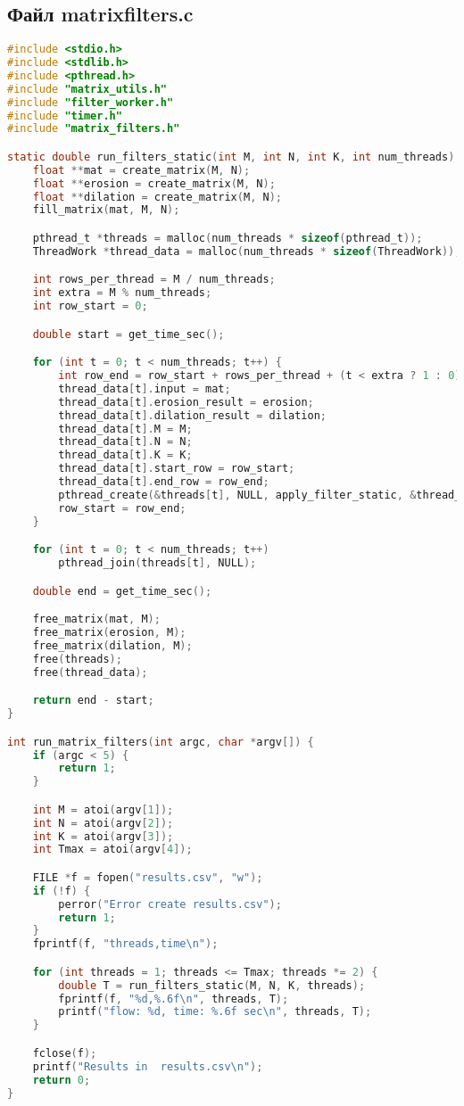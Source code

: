 \subsection*{Файл matrixfilters.c}

\begin{lstlisting}[language=C,caption={Обработка ввода, подсчет времени},captionpos=b]
#include <stdio.h>
#include <stdlib.h>
#include <pthread.h>
#include "matrix_utils.h"
#include "filter_worker.h"
#include "timer.h"
#include "matrix_filters.h"

static double run_filters_static(int M, int N, int K, int num_threads) {
    float **mat = create_matrix(M, N);
    float **erosion = create_matrix(M, N);
    float **dilation = create_matrix(M, N);
    fill_matrix(mat, M, N);

    pthread_t *threads = malloc(num_threads * sizeof(pthread_t));
    ThreadWork *thread_data = malloc(num_threads * sizeof(ThreadWork));

    int rows_per_thread = M / num_threads;
    int extra = M % num_threads;
    int row_start = 0;

    double start = get_time_sec();

    for (int t = 0; t < num_threads; t++) {
        int row_end = row_start + rows_per_thread + (t < extra ? 1 : 0);
        thread_data[t].input = mat;
        thread_data[t].erosion_result = erosion;
        thread_data[t].dilation_result = dilation;
        thread_data[t].M = M;
        thread_data[t].N = N;
        thread_data[t].K = K;
        thread_data[t].start_row = row_start;
        thread_data[t].end_row = row_end;
        pthread_create(&threads[t], NULL, apply_filter_static, &thread_data[t]);
        row_start = row_end;
    }

    for (int t = 0; t < num_threads; t++)
        pthread_join(threads[t], NULL);

    double end = get_time_sec();

    free_matrix(mat, M);
    free_matrix(erosion, M);
    free_matrix(dilation, M);
    free(threads);
    free(thread_data);

    return end - start;
}

int run_matrix_filters(int argc, char *argv[]) {
    if (argc < 5) {
        return 1;
    }

    int M = atoi(argv[1]);
    int N = atoi(argv[2]);
    int K = atoi(argv[3]);
    int Tmax = atoi(argv[4]);

    FILE *f = fopen("results.csv", "w");
    if (!f) {
        perror("Error create results.csv");
        return 1;
    }
    fprintf(f, "threads,time\n");

    for (int threads = 1; threads <= Tmax; threads *= 2) {
        double T = run_filters_static(M, N, K, threads);
        fprintf(f, "%d,%.6f\n", threads, T);
        printf("flow: %d, time: %.6f sec\n", threads, T);
    }

    fclose(f);
    printf("Results in  results.csv\n");
    return 0;
}

\end{lstlisting}

